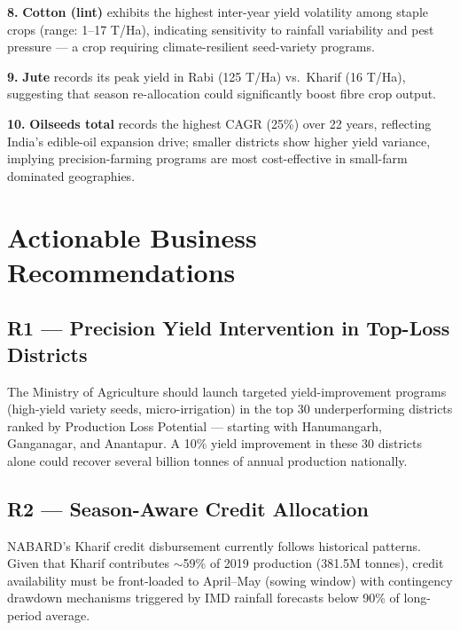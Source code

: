 \documentclass[10pt]{article}
\begin{document}
\vspace{3pt}

\begin{insightbox}
  \textbf{8.} \textbf{Cotton (lint)} exhibits the highest inter-year yield
  volatility among staple crops (range: 1–17 T/Ha), indicating sensitivity to
  rainfall variability and pest pressure — a crop requiring climate-resilient
  seed-variety programs.
\end{insightbox}

\vspace{3pt}

\begin{insightbox}
  \textbf{9.} \textbf{Jute} records its peak yield in Rabi (125 T/Ha) vs.\
  Kharif (16 T/Ha), suggesting that season re-allocation could significantly
  boost fibre crop output.
\end{insightbox}

\vspace{3pt}

\begin{insightbox}
  \textbf{10.} \textbf{Oilseeds total} records the highest CAGR (25\%) over 22 years,
  reflecting India's edible-oil expansion drive; smaller districts show higher yield
  variance, implying precision-farming programs are most cost-effective in small-farm
  dominated geographies.
\end{insightbox}

\section{Actionable Business Recommendations}

\subsection{R1 — Precision Yield Intervention in Top-Loss Districts}
The Ministry of Agriculture should launch targeted yield-improvement programs
(high-yield variety seeds, micro-irrigation) in the top 30 underperforming
districts ranked by Production Loss Potential — starting with Hanumangarh,
Ganganagar, and Anantapur. A 10\% yield improvement in these 30 districts
alone could recover several billion tonnes of annual production nationally.

\subsection{R2 — Season-Aware Credit Allocation}
NABARD's Kharif credit disbursement currently follows historical patterns.
Given that Kharif contributes $\sim$59\% of 2019 production (381.5M tonnes),
credit availability must be front-loaded to April–May (sowing window) with
contingency drawdown mechanisms triggered by IMD rainfall forecasts below
90\% of long-period average.
\end{document}
